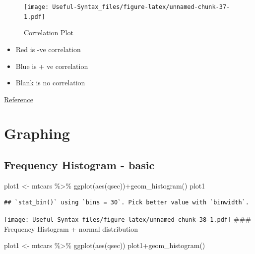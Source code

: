 \documentclass[
]{book}
\newenvironment{Shaded}{\begin{snugshade}}{\end{snugshade}}
\newcommand{\FunctionTok}[1]{\textcolor[rgb]{0.00,0.00,0.00}{#1}}
\newcommand{\NormalTok}[1]{#1}
\newcommand{\OtherTok}[1]{\textcolor[rgb]{0.56,0.35,0.01}{#1}}
\newcommand{\SpecialCharTok}[1]{\textcolor[rgb]{0.00,0.00,0.00}{#1}}
\providecommand{\tightlist}{%
  \setlength{\itemsep}{0pt}\setlength{\parskip}{0pt}}
\begin{document}
\begin{figure}
\centering
\texttt{[image: Useful-Syntax\_files/figure-latex/unnamed-chunk-37-1.pdf]}
\caption{\label{fig:unnamed-chunk-37}Correlation Plot}
\end{figure}

\begin{itemize}
\tightlist
\item
  Red is -ve correlation
\item
  Blue is + ve correlation
\item
  Blank is no correlation
\end{itemize}

\href{https://cran.r-project.org/web/packages/corrplot/vignettes/corrplot-intro.html}{Reference}

\hypertarget{graphing}{%
\section{Graphing}\label{graphing}}

\hypertarget{frequency-histogram---basic}{%
\subsection{Frequency Histogram - basic}\label{frequency-histogram---basic}}

\begin{Shaded}
\begin{Highlighting}[]
\NormalTok{plot1 }\OtherTok{\textless{}{-}}\NormalTok{ mtcars }\SpecialCharTok{\%\textgreater{}\%} \FunctionTok{ggplot}\NormalTok{(}\FunctionTok{aes}\NormalTok{(qsec))}\SpecialCharTok{+}\FunctionTok{geom\_histogram}\NormalTok{()}
\NormalTok{plot1}
\end{Highlighting}
\end{Shaded}

\begin{verbatim}
## `stat_bin()` using `bins = 30`. Pick better value with `binwidth`.
\end{verbatim}

\texttt{[image: Useful-Syntax\_files/figure-latex/unnamed-chunk-38-1.pdf]}
\#\#\# Frequency Histogram + normal distribution

\begin{Shaded}
\begin{Highlighting}[]
\NormalTok{plot1 }\OtherTok{\textless{}{-}}\NormalTok{ mtcars }\SpecialCharTok{\%\textgreater{}\%} \FunctionTok{ggplot}\NormalTok{(}\FunctionTok{aes}\NormalTok{(qsec))}
\NormalTok{plot1}\SpecialCharTok{+}\FunctionTok{geom\_histogram}\NormalTok{()}
\end{Highlighting}
\end{Shaded}
\end{document}
